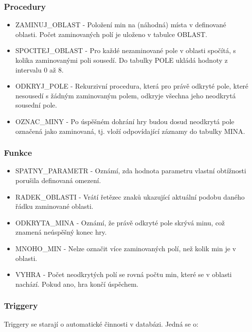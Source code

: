 \documentclass[12pt, a4paper]{article}
\begin{document}
\subsubsection{Procedury}

\begin{itemize}
\item ZAMINUJ\_OBLAST - Položení min na (náhodná) místa v definované oblasti. Počet zaminovaných polí je uloženo v tabulce OBLAST.
\item SPOCITEJ\_OBLAST - Pro každé nezaminované pole v oblasti spočítá, s kolika zaminovanými poli sousedí. Do tabulky POLE ukládá hodnoty z intervalu 0 až 8.
\item ODKRYJ\_POLE - Rekurzivní procedura, která pro právě odkryté pole, které nesousedí s žádným zaminovaným polem, odkryje všechna jeho neodkrytá sousední pole.
\item OZNAC\_MINY - Po úspěšném dohrání hry budou dosud neodkrytá pole označená jako zaminovaná, tj. vloží odpovídající záznamy do tabulky MINA.
\end{itemize}

\subsubsection{Funkce}

\begin{itemize}
\item SPATNY\_PARAMETR - Oznámí, zda hodnota parametru vlastní obtížnosti porušila definovaná omezení.
\item RADEK\_OBLASTI - Vrátí řetězec znaků ukazující aktuální podobu daného řádku zaminované oblasti.
\item ODKRYTA\_MINA - Oznámí, že právě odkryté pole skrývá minu, což znamená neúspěšný konec hry.
\item MNOHO\_MIN - Nelze označit více zaminovaných polí, než kolik min je v oblasti.
\item VYHRA - Počet neodkrytých polí se rovná počtu min, které se v oblasti nachází. Pokud ano, hra končí úspěchem.
\end{itemize}

\subsubsection{Triggery}

Triggery se starají o automatické činnosti v databázi. Jedná se o:
\end{document}
